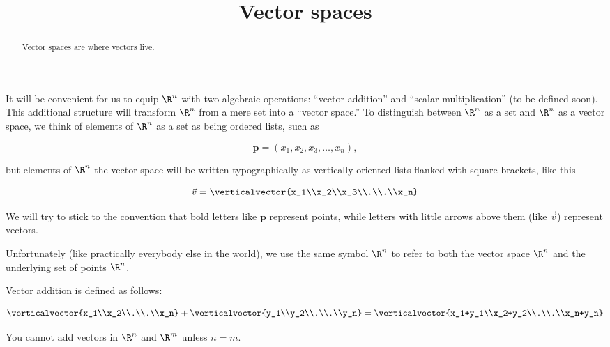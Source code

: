\documentclass{ximera}
\title{Vector spaces}
\begin{document}
\begin{abstract}
  Vector spaces are where vectors live.
\end{abstract}
\maketitle

It will be convenient for us to equip $\R^n$ with two algebraic
operations: ``vector addition'' and ``scalar multiplication'' (to be
defined soon).  This additional structure will transform $\R^n$ from a
mere set into a ``vector space.''  To distinguish between $\R^n$ as a
set and $\R^n$ as a vector space, we think of elements of $\R^n$ as a
set as being ordered lists, such as
 
 \[\mathbf{p} = (x_1,x_2,x_3,\dots,x_n),\]
 
but elements of $\R^n$ the vector space will be written typographically as vertically oriented lists flanked with square brackets, like this 
 
  \[ \vec{v}= \verticalvector{x_1\\x_2\\x_3\\.\\.\\x_n}\]
 
We will try to stick to the convention that bold letters like $\mathbf{p}$ represent points, while letters with little arrows above them (like $\vec{v}$) represent vectors. 

Unfortunately (like practically everybody else in the world), we use
the same symbol $\R^n$ to refer to both the vector space $\R^n$ and
the underlying set of points $\R^n$.
 
Vector addition is defined as follows:
 
\[\verticalvector{x_1\\x_2\\.\\.\\x_n} +\verticalvector{y_1\\y_2\\.\\.\\y_n}=\verticalvector{x_1+y_1\\x_2+y_2\\.\\.\\x_n+y_n}\]

\begin{warning}
  You cannot add vectors in $\R^n$ and $\R^m$ unless $n = m$.
\end{warning}
\end{document}
